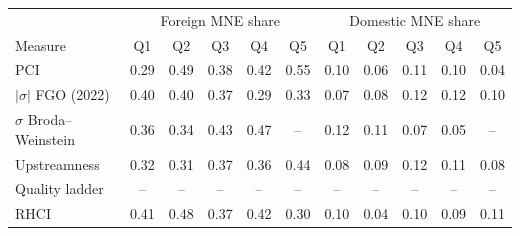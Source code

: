 \begin{tabular}{lccccc|ccccc}
\toprule
 & \multicolumn{5}{c}{Foreign MNE share} & \multicolumn{5}{c}{Domestic MNE share} \\
Measure & Q1 & Q2 & Q3 & Q4 & Q5 & Q1 & Q2 & Q3 & Q4 & Q5 \\
\midrule
PCI & 0.29 & 0.49 & 0.38 & 0.42 & 0.55 & 0.10 & 0.06 & 0.11 & 0.10 & 0.04 \\
$|\sigma|$ FGO (2022) & 0.40 & 0.40 & 0.37 & 0.29 & 0.33 & 0.07 & 0.08 & 0.12 & 0.12 & 0.10 \\
$\sigma$ Broda--Weinstein & 0.36 & 0.34 & 0.43 & 0.47 & -- & 0.12 & 0.11 & 0.07 & 0.05 & -- \\
Upstreamness & 0.32 & 0.31 & 0.37 & 0.36 & 0.44 & 0.08 & 0.09 & 0.12 & 0.11 & 0.08 \\
Quality ladder & -- & -- & -- & -- & -- & -- & -- & -- & -- & -- \\
RHCI & 0.41 & 0.48 & 0.37 & 0.42 & 0.30 & 0.10 & 0.04 & 0.10 & 0.09 & 0.11 \\
\bottomrule
\end{tabular}
